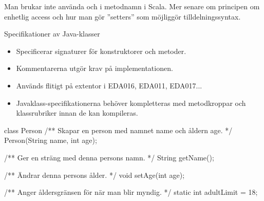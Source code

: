 \ifkompendium
Man brukar inte använda  och  i metodnamn i Scala. Mer senare om principen om enhetlig access  och hur man gör ''setters'' som möjliggör tilldelningssyntax.
\fi


\begin{Slide}{Specifikationer av Java-klasser}
\begin{itemize}\small
\item Specificerar signaturer för konstruktorer och metoder. 
\item Kommentarerna utgör krav på implementationen.  
\item Används flitigt på extentor i EDA016, EDA011, EDA017...
\item Javaklass-specifikationerna behöver kompletteras med metodkroppar och klassrubriker innan de kan kompileras.
\end{itemize}
\begin{JavaSpec}{class Person}
/** Skapar en person med namnet name och åldern age. */
Person(String name, int age);

/** Ger en sträng med denna persons namn. */
String getName();

/** Ändrar denna persons ålder. */
void setAge(int age);

/** Anger åldersgränsen för när man blir myndig. */
static int adultLimit = 18;
\end{JavaSpec}
\end{Slide}

